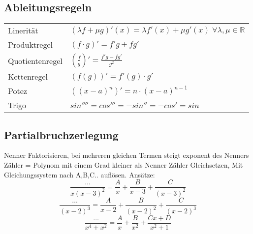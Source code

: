 \subsection{Ableitungsregeln}
\begin{tabular}{ll}
Linerität & $(\lambda f + \mu g)'(x) = \lambda f'(x) + \mu g'(x) \; \forall \lambda, \mu \in \mathbb{R} $ \\
Produktregel & $(f\cdot g)' = f'g + fg'$\\
Quotientenregel & $(\frac{f}{g})' = \frac{f'g - fg'}{g^2}$\\
Kettenregel & $ (f(g))' = f'(g) \cdot g' $\\
Potez & $((x-a)^n)'= n\cdot(x-a)^{n-1}$\\
Trigo & $sin'''' = cos''' = -sin'' = -cos' = sin$\\
\end{tabular}


\subsection{Partialbruchzerlegung}
Nenner Faktorisieren, bei mehreren gleichen Termen steigt exponent des Nenners
Zähler = Polynom mit einem Grad kleiner als Nenner
Zähler Gleichsetzen, Mit Gleichungssystem nach A,B,C.. auflösen.
Ansätze:
$$\frac{\dots}{x(x-3)^2} = \frac{A}{x} + \frac{B}{x-3} + \frac{C}{(x-3)^2}$$
$$\frac{\dots}{(x-2)^3} = \frac{A}{x-2} + \frac{B}{(x-2)^2} + \frac{C}{(x-2)^3}$$
$$\frac{\dots}{x^4 + x^2} = \frac{A}{x} + \frac{B}{x^2} + \frac{Cx + D}{x^2 + 1}$$